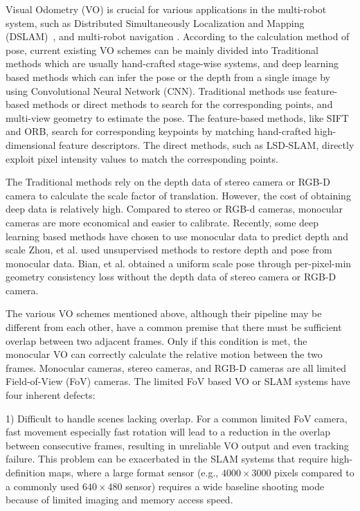 \label{sec:related}

Visual Odometry (VO) is crucial for various applications in the multi-robot system, such as Distributed Simultaneously Localization and Mapping (DSLAM)~\cite{corah2019communication, cieslewski2018data}, and multi-robot navigation \cite{tanner2005towards}.
According to the calculation method of pose, current existing VO schemes can be mainly divided into Traditional methods which are usually hand-crafted stage-wise systems, and deep learning based methods which can infer the pose or the depth from a single image by using Convolutional Neural Network (CNN).
Traditional methods use feature-based methods or direct methods to search for the corresponding points, and multi-view geometry to estimate the pose.
The feature-based methods, like SIFT and ORB, search for corresponding keypoints by matching hand-crafted high-dimensional feature descriptors.
The direct methods, such as LSD-SLAM, directly exploit pixel intensity values to match the corresponding points.

The Traditional methods rely on the depth data of stereo camera or RGB-D camera to calculate the scale factor of translation.
However, the cost of obtaining deep data is relatively high. Compared to stereo or RGB-d cameras, monocular cameras are more economical and easier to calibrate. 
Recently, some deep learning based methods have chosen to use monocular data to predict depth and scale
Zhou, et al. used unsupervised methods to restore depth and pose from monocular data.
Bian, et al. obtained a uniform scale pose through per-pixel-min geometry consistency loss without the depth data of stereo camera or RGB-D camera.

The various VO schemes mentioned above, although their pipeline may be different from each other, have a common premise that there must be sufficient overlap between two adjacent frames.
Only if this condition is met, the monocular VO can correctly calculate the relative motion between the two frames.
Monocular cameras, stereo cameras, and RGB-D cameras are all limited Field-of-View (FoV) cameras.
The limited FoV based VO or SLAM systems have four inherent defects:

1) Difficult to handle scenes lacking overlap. 
For a common limited FoV camera, fast movement especially fast rotation will lead to a reduction in the overlap between consecutive frames, resulting in unreliable VO output and even tracking failure. 
This problem can be exacerbated in the SLAM systems that require high-definition maps, where a large format sensor (e.g., $4000 \times 3000$ pixels compared to a commonly used $640 \times 480$ sensor) requires a wide baseline shooting mode because of limited imaging and memory access speed.

